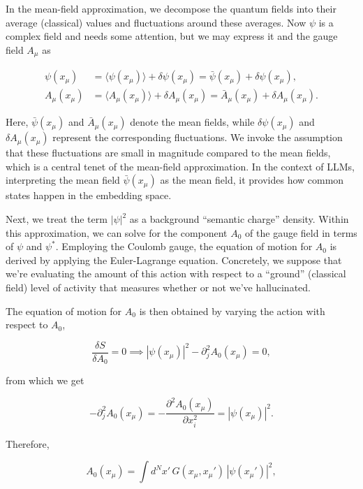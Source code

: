 \documentclass[prd,amsmath,amssymb,12pt]{revtex4}
\begin{document}
In the mean-field approximation, we decompose the quantum fields into their average (classical) values and
fluctuations around these averages. Now $\psi$ is a complex field and needs some attention, but we may express it
and the gauge field $A_\mu$ as

\begin{align}
\psi(x_{\mu}) &= \langle \psi(x_{\mu}) \rangle + \delta \psi(x_{\mu}) = \bar{\psi}(x_{\mu}) + \delta \psi(x_{\mu}), \\
A_\mu(x_{\mu}) &= \langle A_\mu(x_{\mu}) \rangle + \delta A_\mu(x_{\mu}) = \bar{A}_\mu(x_{\mu}) + \delta A_\mu(x_{\mu}).
\end{align}

\noindent
Here, $\bar{\psi}(x_{\mu})$ and $\bar{A}_\mu(x_{\mu})$ denote the mean fields, while $\delta \psi(x_{\mu})$
and $\delta A_\mu(x_{\mu})$ represent the corresponding fluctuations. We invoke the assumption that these
fluctuations are small in magnitude compared to the mean fields, which is a central tenet of the mean-field approximation.
In the context of LLMs, interpreting the mean field $\bar{\psi}(x_{\mu})$ as the mean field, it provides how
common states happen in the embedding space.

Next, we treat the term $|\psi|^2$ as a background ``semantic charge'' density. Within this approximation, we can
solve for the component $A_0$ of the gauge field in terms of $\psi$ and $\psi^*$. Employing the Coulomb gauge,
the equation of motion for $A_0$ is derived by applying the Euler-Lagrange equation. Concretely,
we suppose that we're evaluating the amount of this action with respect to a ``ground'' (classical field) level of activity
that measures whether or not we've hallucinated.

The equation of motion for $A_0$ is then obtained by varying the action with respect to $A_0$,

\begin{equation}
\frac{\delta S}{\delta A_0} = 0 \implies |\psi(x_{\mu})|^2 - \partial_j^2 A_0(x_{\mu}) = 0,
\end{equation}

\noindent
from which we get

\begin{equation}
-\partial_j^2 A_0(x_{\mu}) = - \frac{\partial^2 A_0(x_{\mu})}{\partial x_i^2} = |\psi(x_{\mu})|^2.
\end{equation}

\noindent
Therefore,

\begin{equation}
A_0(x_{\mu}) = \int d^{N} x' \, G(x_{\mu}, x_{\mu}') \, |\psi(x_{\mu}')|^2,
\end{equation}
\end{document}
